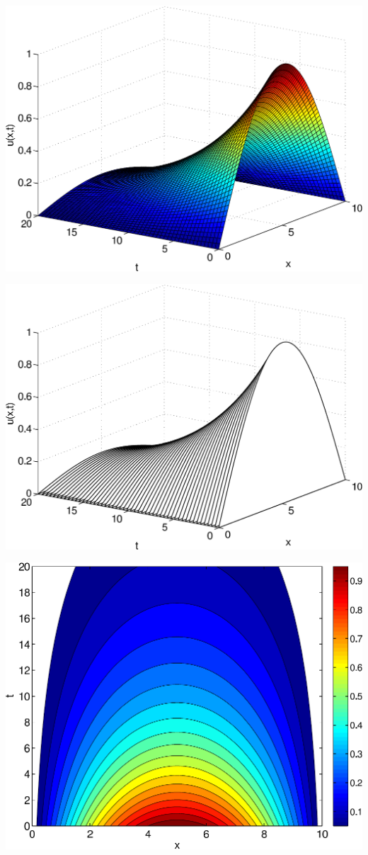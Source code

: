 \begin{solution}
\begin{enumerate}
\begin{center}
           \includegraphics[scale=0.53]{checksol3}

           \includegraphics[scale=0.53]{checksol4}

           \includegraphics[scale=0.53]{checksol5}
      \end{center}


\end{enumerate}
\end{solution}

